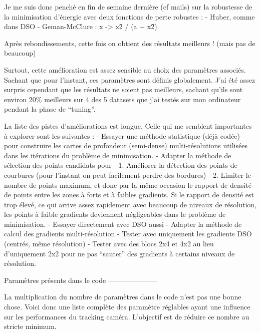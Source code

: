 Je me suis donc penché en fin de semaine dernière (cf mails) sur la robustesse de la minimisation d’énergie avec deux fonctions de perte robustes :
- Huber, comme dans DSO
- Geman-McClure : x -> x\^2 / (a + x\^2)

Après rebondissements, cette fois on obtient des résultats meilleurs ! (mais pas de beaucoup)

Surtout, cette amélioration est assez sensible au choix des paramètres associés. Sachant que pour l’instant, ces paramètres sont définis globalement. J’ai été assez surpris cependant que les résultats ne soient pas meilleurs, sachant qu’ils sont environ 20\% meilleurs sur 4 des 5 datasets que j’ai testés sur mon ordinateur pendant la phase de “tuning”.

La liste des pistes d’améliorations est longue. Celle qui me semblent importantes à explorer sont les suivantes :
- Essayer une méthode statistique (déjà codée) pour construire les cartes de profondeur (semi-dense) multi-résolutions utilisées dans les itérations du problème de minimisation.
- Adapter la méthode de sélection des points candidats pour
  - 1. Améliorer la détection des points de courbures (pour l’instant on peut facilement perdre des bordures)
  - 2. Limiter le nombre de points maximum, et donc par la même occasion le rapport de densité de points entre les zones à forts et à faibles gradients. Si le rapport de densité est trop élevé, ce qui arrive assez rapidement avec beaucoup de niveaux de résolution, les points à faible gradients deviennent négligeables dans le problème de minimisation.
  - Essayer directement avec DSO aussi
- Adapter la méthode de calcul des gradients multi-résolution
  - Tester avec uniquement les gradients DSO (centrés, même résolution)
  - Tester avec des blocs 2x4 et 4x2 au lieu d’uniquement 2x2 pour ne pas “sauter” des gradients à certains niveaux de résolution.

Paramètres présents dans le code
---------------------

La multiplication du nombre de paramètres dans le code n’est pas une bonne chose. Voici donc une liste complète des paramètre réglables ayant une influence sur les performances du tracking caméra. L’objectif est de réduire ce nombre au stricte minimum.

